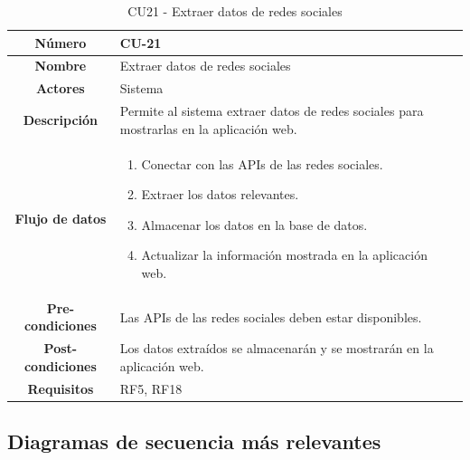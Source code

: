 \begin{table}[h!tb]
	\centering
	\begin{adjustbox}{width=1\textwidth}
	\begin{tabular}{|c|p{\textwidth}|}
		\hline {\bf Número} & CU-21 \\
		\hline {\bf Nombre} & Extraer datos de redes sociales\\
		\hline {\bf Actores} & Sistema \\ 
		\hline {\bf Descripción} & Permite al sistema extraer datos de redes sociales para mostrarlas en la aplicación web. \\ 
		\hline {\bf Flujo de datos}
		& 
		\begin{enumerate}
			\item Conectar con las APIs de las redes sociales.
			\item Extraer los datos relevantes.
			\item Almacenar los datos en la base de datos.
			\item Actualizar la información mostrada en la aplicación web.
		\end{enumerate}\\
		\hline {\bf Pre-condiciones}
		& Las APIs de las redes sociales deben estar disponibles. \\ 
		\hline {\bf Post-condiciones}
		& Los datos extraídos se almacenarán y se mostrarán en la aplicación web. \\ 
		\hline {\bf Requisitos} & RF5, RF18 \\ 
		\hline 
	\end{tabular}
	\end{adjustbox}
	\caption{CU21 - Extraer datos de redes sociales\label{tbl:CU21}}
\end{table}


\clearpage
\subsection{Diagramas de secuencia más relevantes}

